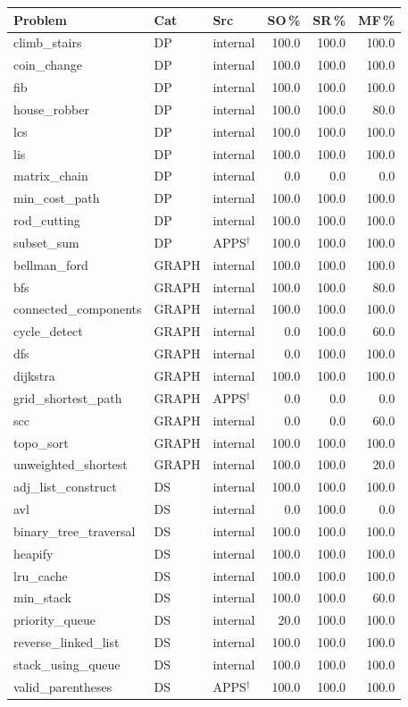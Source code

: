 \begin{tabular}{@{}lllrrr@{}}
\toprule
Problem & Cat & Src & SO\,\% & SR\,\% & MF\,\% \\
\midrule
climb\_stairs & DP & internal & 100.0 & 100.0 & 100.0 \\
coin\_change & DP & internal & 100.0 & 100.0 & 100.0 \\
fib & DP & internal & 100.0 & 100.0 & 100.0 \\
house\_robber & DP & internal & 100.0 & 100.0 & 80.0 \\
lcs & DP & internal & 100.0 & 100.0 & 100.0 \\
lis & DP & internal & 100.0 & 100.0 & 100.0 \\
matrix\_chain & DP & internal & 0.0 & 0.0 & 0.0 \\
min\_cost\_path & DP & internal & 100.0 & 100.0 & 100.0 \\
rod\_cutting & DP & internal & 100.0 & 100.0 & 100.0 \\
subset\_sum & DP & APPS$^\dagger$ & 100.0 & 100.0 & 100.0 \\
\midrule
bellman\_ford & GRAPH & internal & 100.0 & 100.0 & 100.0 \\
bfs & GRAPH & internal & 100.0 & 100.0 & 80.0 \\
connected\_components & GRAPH & internal & 100.0 & 100.0 & 100.0 \\
cycle\_detect & GRAPH & internal & 0.0 & 100.0 & 60.0 \\
dfs & GRAPH & internal & 0.0 & 100.0 & 100.0 \\
dijkstra & GRAPH & internal & 100.0 & 100.0 & 100.0 \\
grid\_shortest\_path & GRAPH & APPS$^\dagger$ & 0.0 & 0.0 & 0.0 \\
scc & GRAPH & internal & 0.0 & 0.0 & 60.0 \\
topo\_sort & GRAPH & internal & 100.0 & 100.0 & 100.0 \\
unweighted\_shortest & GRAPH & internal & 100.0 & 100.0 & 20.0 \\
\midrule
adj\_list\_construct & DS & internal & 100.0 & 100.0 & 100.0 \\
avl & DS & internal & 0.0 & 100.0 & 0.0 \\
binary\_tree\_traversal & DS & internal & 100.0 & 100.0 & 100.0 \\
heapify & DS & internal & 100.0 & 100.0 & 100.0 \\
lru\_cache & DS & internal & 100.0 & 100.0 & 100.0 \\
min\_stack & DS & internal & 100.0 & 100.0 & 60.0 \\
priority\_queue & DS & internal & 20.0 & 100.0 & 100.0 \\
reverse\_linked\_list & DS & internal & 100.0 & 100.0 & 100.0 \\
stack\_using\_queue & DS & internal & 100.0 & 100.0 & 100.0 \\
valid\_parentheses & DS & APPS$^\dagger$ & 100.0 & 100.0 & 100.0 \\
\bottomrule
\end{tabular}

